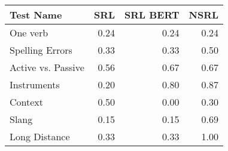 \begin{tabular}{lrrr}
\toprule
         Test Name &  SRL &  SRL BERT &  NSRL \\
\midrule
          One verb & 0.24 &      0.24 &  0.24 \\
   Spelling Errors & 0.33 &      0.33 &  0.50 \\
Active vs. Passive & 0.56 &      0.67 &  0.67 \\
       Instruments & 0.20 &      0.80 &  0.87 \\
           Context & 0.50 &      0.00 &  0.30 \\
             Slang & 0.15 &      0.15 &  0.69 \\
     Long Distance & 0.33 &      0.33 &  1.00 \\
\bottomrule
\end{tabular}
